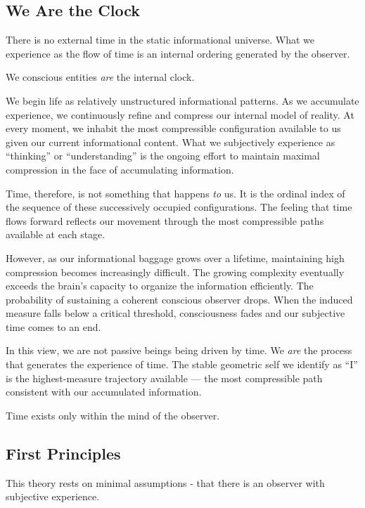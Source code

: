 \subsection*{We Are the Clock}

There is no external time in the static informational universe. What we experience as the flow of time is an internal ordering generated by the observer.

We conscious entities \emph{are} the internal clock.

We begin life as relatively unstructured informational patterns. As we accumulate experience, we continuously refine and compress our internal model of reality. At every moment, we inhabit the most compressible configuration available to us given our current informational content. What we subjectively experience as ``thinking'' or ``understanding'' is the ongoing effort to maintain maximal compression in the face of accumulating information.

Time, therefore, is not something that happens \emph{to} us. It is the ordinal index of the sequence of these successively occupied configurations. The feeling that time flows forward reflects our movement through the most compressible paths available at each stage.

However, as our informational baggage grows over a lifetime, maintaining high compression becomes increasingly difficult. The growing complexity eventually exceeds the brain’s capacity to organize the information efficiently. The probability of sustaining a coherent conscious observer drops. When the induced measure falls below a critical threshold, consciousness fades and our subjective time comes to an end.

In this view, we are not passive beings being driven by time. We \emph{are} the process that generates the experience of time. The stable geometric self we identify as ``I'' is the highest-measure trajectory available --- the most compressible path consistent with our accumulated information.

Time exists only within the mind of the observer.



\subsection*{First Principles}

This theory rests on minimal assumptions - that there is an observer with subjective experience.

